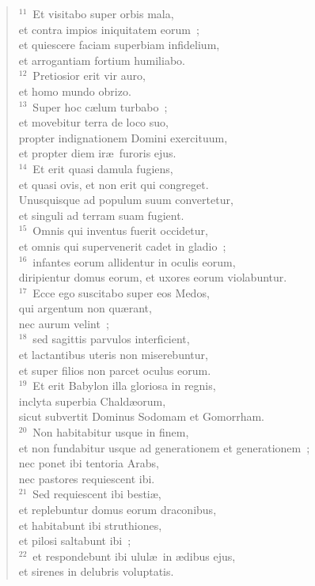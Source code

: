 \begin{verse}
${}^{11}$~Et visitabo super orbis mala,\\ et contra impios iniquitatem eorum~;\\ et quiescere faciam superbiam infidelium,\\ et arrogantiam fortium humiliabo.\\
${}^{12}$~Pretiosior erit vir auro,\\ et homo mundo obrizo.\\
${}^{13}$~Super hoc c\ae lum turbabo~;\\ et movebitur terra de loco suo,\\ propter indignationem Domini exercituum,\\ et propter diem ir\ae\ furoris ejus.\\
${}^{14}$~Et erit quasi damula fugiens,\\ et quasi ovis, et non erit qui congreget.\\ Unusquisque ad populum suum convertetur,\\ et singuli ad terram suam fugient.\\
${}^{15}$~Omnis qui inventus fuerit occidetur,\\ et omnis qui supervenerit cadet in gladio~;\\
${}^{16}$~infantes eorum allidentur in oculis eorum,\\ diripientur domus eorum, et uxores eorum violabuntur.\\
${}^{17}$~Ecce ego suscitabo super eos Medos,\\ qui argentum non qu\ae rant,\\ nec aurum velint~;\\
${}^{18}$~sed sagittis parvulos interficient,\\ et lactantibus uteris non miserebuntur,\\ et super filios non parcet oculus eorum.\\
${}^{19}$~Et erit Babylon illa gloriosa in regnis,\\ inclyta superbia Chald\ae orum,\\ sicut subvertit Dominus Sodomam et Gomorrham.\\
${}^{20}$~Non habitabitur usque in finem,\\ et non fundabitur usque ad generationem et generationem~;\\ nec ponet ibi tentoria Arabs,\\ nec pastores requiescent ibi.\\
${}^{21}$~Sed requiescent ibi besti\ae ,\\ et replebuntur domus eorum draconibus,\\ et habitabunt ibi struthiones,\\ et pilosi saltabunt ibi~;\\
${}^{22}$~et respondebunt ibi ulul\ae\ in \ae dibus ejus,\\ et sirenes in delubris voluptatis.\end{verse}


